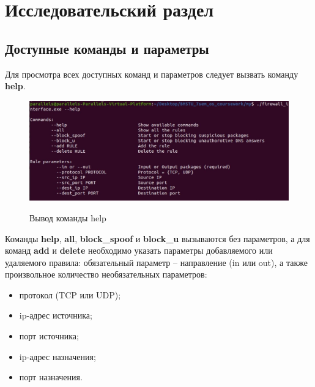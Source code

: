 \chapter{Исследовательский раздел}

\section{Доступные команды и параметры}


Для просмотра всех доступных команд и параметров следует вызвать команду \textbf{help}.


\begin{figure}[h!]
	\begin{center}
		{\includegraphics[scale = 0.5]{inc/img/commands.png}}
		\caption{Вывод команды help}
		\label{img:commands}
	\end{center}
\end{figure}


Команды \textbf{help}, \textbf{all}, \textbf{block\_spoof} и \textbf{block\_u} вызываются без параметров, а для команд \textbf{add} и \textbf{delete} необходимо указать параметры добавляемого или удаляемого правила: обязательный параметр -- направление (in или out), а также произвольное количество  необязательных параметров:
\begin{itemize}
	\item протокол (TCP или UDP);
	\item ip-адрес источника;
	\item порт источника;
	\item ip-адрес назначения;
	\item порт назначения.
\end{itemize}

